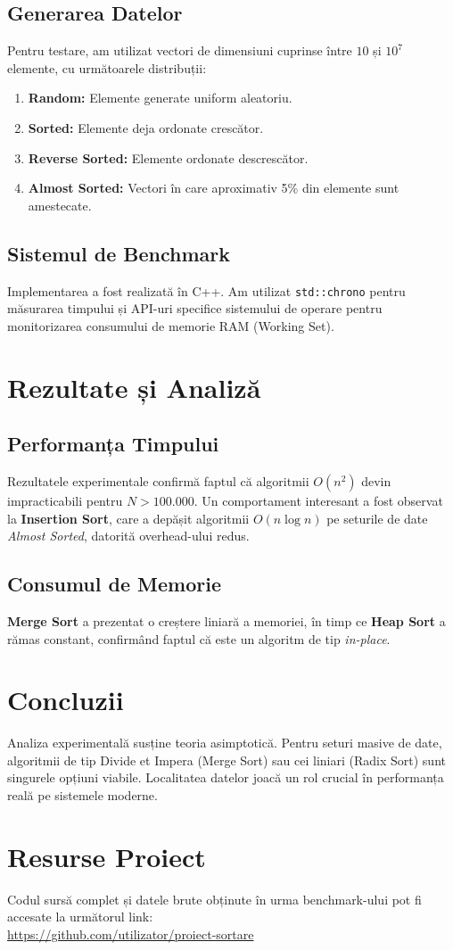 \documentclass[12pt,a4paper]{article}
\begin{document}
\subsection{Generarea Datelor}
Pentru testare, am utilizat vectori de dimensiuni cuprinse între $10$ și $10^7$ elemente, cu următoarele distribuții:
\begin{enumerate}
    \item \textbf{Random:} Elemente generate uniform aleatoriu.
    \item \textbf{Sorted:} Elemente deja ordonate crescător.
    \item \textbf{Reverse Sorted:} Elemente ordonate descrescător.
    \item \textbf{Almost Sorted:} Vectori în care aproximativ 5\% din elemente sunt amestecate.
\end{enumerate}

\subsection{Sistemul de Benchmark}
Implementarea a fost realizată în C++. Am utilizat \texttt{std::chrono} pentru măsurarea timpului și API-uri specifice sistemului de operare pentru monitorizarea consumului de memorie RAM (Working Set).

\section{Rezultate și Analiză}
\subsection{Performanța Timpului}
Rezultatele experimentale confirmă faptul că algoritmii $O(n^2)$ devin impracticabili pentru $N > 100.000$. Un comportament interesant a fost observat la \textbf{Insertion Sort}, care a depășit algoritmii $O(n \log n)$ pe seturile de date \textit{Almost Sorted}, datorită overhead-ului redus.

\subsection{Consumul de Memorie}
\textbf{Merge Sort} a prezentat o creștere liniară a memoriei, în timp ce \textbf{Heap Sort} a rămas constant, confirmând faptul că este un algoritm de tip \textit{in-place}.

\section{Concluzii}
Analiza experimentală susține teoria asimptotică. Pentru seturi masive de date, algoritmii de tip Divide et Impera (Merge Sort) sau cei liniari (Radix Sort) sunt singurele opțiuni viabile. Localitatea datelor joacă un rol crucial în performanța reală pe sistemele moderne.

\section{Resurse Proiect}
Codul sursă complet și datele brute obținute în urma benchmark-ului pot fi accesate la următorul link: \\
\url{https://github.com/utilizator/proiect-sortare}
\end{document}
